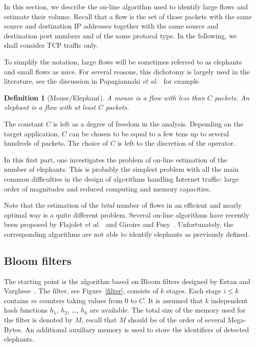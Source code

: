 \documentclass{amsart}
\newtheorem{definition}{Definition}
\def\etal{{\em et al.}}
\begin{document}
In  this section,  we  describe the  on-line algorithm  used  to identify  large  flows  and
estimate their  volume.  Recall  that a flow  is the  set of those  packets with  the same
source and  destination IP addresses  together with the  same source and  destination port
numbers and  of the same protocol  type. In the  following, we shall consider  TCP traffic
only.

To simplify the notation, large  flows will be sometimes referred to as elephants and small flows as
mice. For several reasons, this dichotomy is largely used in the literature, see the
discussion in Papagiannaki \etal~\cite{Taft} for example. 
\begin{definition}[Mouse/Elephant] A mouse is a flow with less than $C$ packets. An elephant is a flow with at least $C$ packets.
\end{definition}
The constant $C$ is left as a degree of freedom in the analysis. Depending on the target
application, $C$ can be chosen to be equal to a few tens up to several hundreds of
packets. The choice of $C$ is left to the discretion of the operator. 

In this first  part, one investigates the  problem of on-line estimation of  the number of
elephants. This is probably the simplest  problem with all the main common difficulties in the design of  algorithms  handling Internet traffic: large order  of
 magnitudes and
reduced computing and memory capacities.

Note  that the estimation of  the {\em total} number of flows in  an
efficient and nearly optimal way is a quite different problem. Several
on-line algorithms have  recently    been
proposed by  Flajolet \etal~\cite{Flajolet}   and  Giroire   and  Fusy~\cite{Giroire}.
Unfortunately,  the corresponding algorithms are not able to identify
elephants as previously defined.

\subsection{Bloom filters}

The starting point is the algorithm  based  on  Bloom filters designed
by Estan  and
Varghese~\cite{Varghese}.   The filter, see Figure~\ref{filter}, consists of $k$
stages. Each stage  $i\leq k$ contains $m$ counters taking values from $0$ to $C$. It is
assumed  that $k$ independent hash functions $h_1$, $h_2$, \ldots, $h_k$ are
available. The total size of the memory used for the filter is denoted by $M$, recall that
$M$ should be of the order of several Mega-Bytes.  An additional  auxiliary  memory is
used to store the identifiers  of detected elephants.  
\end{document}
